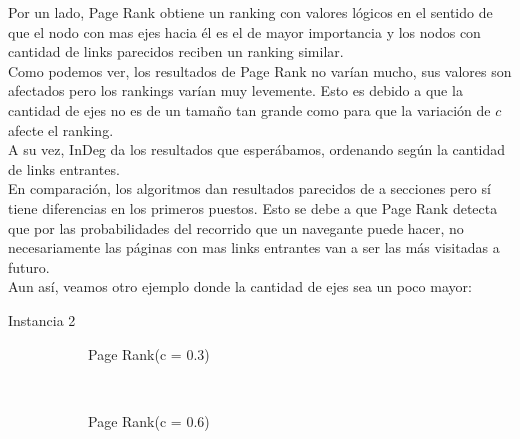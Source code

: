 Por un lado, Page Rank obtiene un ranking con valores lógicos en el sentido de que el nodo con mas ejes hacia él es el de mayor importancia y los nodos con cantidad de links parecidos reciben un ranking similar.\\
Como podemos ver, los resultados de Page Rank no varían mucho, sus valores son afectados pero los rankings varían muy levemente. Esto es debido a que la cantidad de ejes no es de un tamaño tan grande como para que la variación de $c$ afecte el ranking.\\
A su vez, InDeg da los resultados que esperábamos, ordenando según la cantidad de links entrantes.\\
En comparación, los algoritmos dan resultados parecidos de a secciones pero sí tiene diferencias en los primeros puestos. Esto se debe a que Page Rank detecta que por las probabilidades del recorrido que un navegante puede hacer, no necesariamente las páginas con mas links entrantes van a ser las más visitadas a futuro.\\

Aun así, veamos otro ejemplo donde la cantidad de ejes sea un poco mayor:

\begin{center}
Instancia 2
\end{center}

\begin{figure}[H]
    \centering
    \begin{subfigure}[t]{0.5\textwidth}
      \begin{center}
        Page Rank(c = 0.3)\\
      \end{center}
    \end{subfigure}%
    ~
    \begin{subfigure}[t]{0.5\textwidth}
      \begin{center}
        Page Rank(c = 0.6)\\
      \end{center}
    \end{subfigure}
\end{figure}

